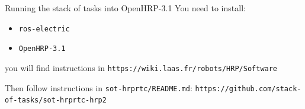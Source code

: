%
%

\begin{frame} {Running the stack of tasks into OpenHRP-3.1}
  You need to install:
  \begin{itemize}
    \item \texttt{ros-electric}
    \item \texttt{OpenHRP-3.1}
  \end{itemize}
  you will find instructions in \texttt{\tiny https://wiki.laas.fr/robots/HRP/Software}

  Then follow instructions in \texttt{\tiny sot-hrprtc/README.md}: \texttt{https://github.com/stack-of-tasks/sot-hrprtc-hrp2}
\end{frame}
